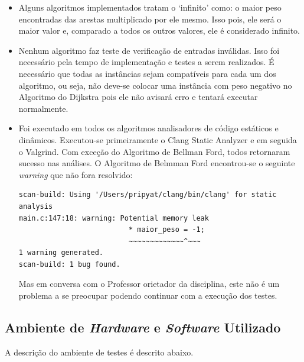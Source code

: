 \documentclass[12pt]{article}
\begin{document}
\begin{itemize}
	\item Alguns algoritmos implementados tratam o `infinito' como: o maior peso encontradas das arestas multiplicado por ele mesmo. \newline
    	Isso pois, ele será o maior valor e, comparado a todos os outros valores, ele é considerado infinito.
        
    \item Nenhum algoritmo faz teste de verificação de entradas inválidas. \newline
    	Isso foi necessário pela tempo de implementação e testes a serem realizados. É necessário que todas as instâncias sejam compatíveis para cada um dos algoritmo, ou seja, não deve-se colocar uma instância com peso negativo no Algoritmo do Dijkstra pois ele não avisará erro e tentará executar normalmente. 
        
    \item Foi executado em todos os algoritmos analisadores de código estáticos e dinâmicos. Executou-se primeiramente o Clang Static Analyzer e em seguida o Valgrind. Com exceção do Algoritmo de Bellman Ford, todos retornaram sucesso nas análises.\newline 
    O Algoritmo de Belmman Ford encontrou-se o seguinte \textit{warning} que não fora resolvido:
\begin{verbatim}
scan-build: Using '/Users/pripyat/clang/bin/clang' for static analysis
main.c:147:18: warning: Potential memory leak
                          * maior_peso = -1;
                          ~~~~~~~~~~~~~^~~~
1 warning generated.
scan-build: 1 bug found.
\end{verbatim}
    Mas em conversa com o Professor orietador da disciplina, este não é um problema a se preocupar podendo continuar com a execução dos testes.
        
       
\end{itemize}


\subsection{Ambiente de \textit{Hardware} e \textit{Software }Utilizado}

A descrição do ambiente de testes é descrito abaixo.
\end{document}
